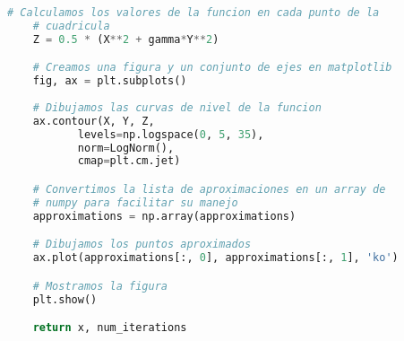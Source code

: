 \begin{enumerate}
\begin{enumerate}[\bfseries (a)]
\begin{lstlisting}[language=Python]
    # Calculamos los valores de la funcion en cada punto de la 
    # cuadricula
    Z = 0.5 * (X**2 + gamma*Y**2)

    # Creamos una figura y un conjunto de ejes en matplotlib
    fig, ax = plt.subplots()
    
    # Dibujamos las curvas de nivel de la funcion
    ax.contour(X, Y, Z, 
	       levels=np.logspace(0, 5, 35), 
	       norm=LogNorm(), 
	       cmap=plt.cm.jet)

    # Convertimos la lista de aproximaciones en un array de 
    # numpy para facilitar su manejo
    approximations = np.array(approximations)

    # Dibujamos los puntos aproximados
    ax.plot(approximations[:, 0], approximations[:, 1], 'ko')

    # Mostramos la figura
    plt.show()

    return x, num_iterations
\end{lstlisting}
    \end{enumerate}


\end{enumerate}

